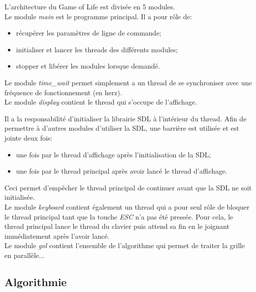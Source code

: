 \documentclass[11pt, a4paper]{article}
\begin{document}
L'architecture du Game of Life est divisée en 5 modules. \\

Le module \textit{main} est le programme principal.
Il a pour rôle de:

\begin{itemize}
    \item récupérer les paramètres de ligne de commande;
    \item initialiser et lancer les threads des différents modules;
    \item stopper et libérer les modules lorsque demandé. \\
\end{itemize}

Le module \textit{time\_wait} permet simplement a un thread
de se synchroniser avec une fréquence de fonctionnement (en herz). \\

Le module \textit{display} contient le thread qui s'occupe de l'affichage.

Il a la responsabilité d'initialiser la librairie SDL à l'intérieur du thread.
Afin de permettre à d'autres modules d'utiliser la SDL, une barrière est utilisée et est jointe deux fois:

\begin{itemize}
    \item une fois par le thread d'affichage après l'initialisation de la SDL;
    \item une fois par le thread principal après avoir lancé le thread d'affichage.
\end{itemize}

Ceci permet d'empêcher le thread principal de continuer avant que la SDL ne soit initialisée. \\

Le module \textit{keyboard} contient également un thread qui a pour seul rôle de bloquer le thread principal
tant que la touche \textit{ESC} n'a pas été pressée.
Pour cela, le thread principal lance le thread du clavier puis attend sa fin en le joignant immédiatement après l'avoir lancé. \\

Le module \textit{gol} contient l'ensemble de l'algorithme qui permet de traiter la grille en parallèle...

\subsection{Algorithmie}
\end{document}
